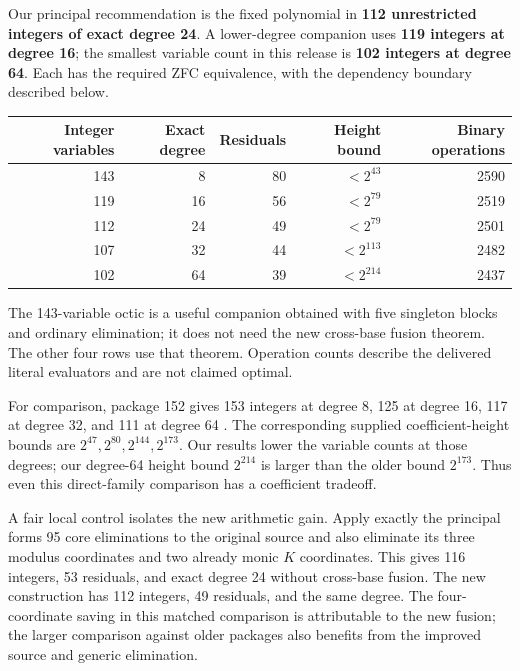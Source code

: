 Our principal recommendation is the fixed polynomial in \textbf{112 unrestricted integers of exact degree 24}. A lower-degree companion uses \textbf{119 integers at degree 16}; the smallest variable count in this release is \textbf{102 integers at degree 64}. Each has the required ZFC equivalence, with the dependency boundary described below.

\begin{center}

\begin{tabular}{rrrrr}

\toprule

Integer variables & Exact degree & Residuals & Height bound & Binary operations\\

\midrule

143 & 8 & 80 & $<2^{43}$ & 2590\\

119 & 16 & 56 & $<2^{79}$ & 2519\\

112 & 24 & 49 & $<2^{79}$ & 2501\\

107 & 32 & 44 & $<2^{113}$ & 2482\\

102 & 64 & 39 & $<2^{214}$ & 2437\\

\bottomrule

\end{tabular}

\end{center}

The 143-variable octic is a useful companion obtained with five singleton blocks and ordinary elimination; it does not need the new cross-base fusion theorem. The other four rows use that theorem. Operation counts describe the delivered literal evaluators and are not claimed optimal.

For comparison, package 152 gives 153 integers at degree 8, 125 at degree 16, 117 at degree 32, and 111 at degree 64 \cite{eliminate152}. The corresponding supplied coefficient-height bounds are $2^{47},2^{80},2^{144},2^{173}$. Our results lower the variable counts at those degrees; our degree-64 height bound $2^{214}$ is larger than the older bound $2^{173}$. Thus even this direct-family comparison has a coefficient tradeoff.

A fair local control isolates the new arithmetic gain. Apply exactly the principal form\textquotesingle s 95 core eliminations to the original source and also eliminate its three modulus coordinates and two already monic $K$ coordinates. This gives 116 integers, 53 residuals, and exact degree 24 without cross-base fusion. The new construction has 112 integers, 49 residuals, and the same degree. The four-coordinate saving in this matched comparison is attributable to the new fusion; the larger comparison against older packages also benefits from the improved source and generic elimination.
